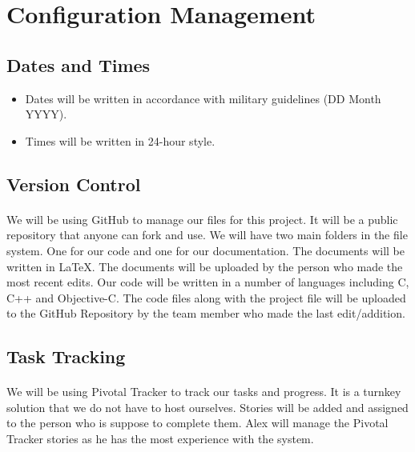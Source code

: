 \section{Configuration Management}
\subsection{Dates and Times}
\begin{itemize}
\item Dates will be written in accordance with military guidelines (DD Month YYYY).
\item Times will be written in 24-hour style.
\end{itemize}
\subsection{Version Control}
\paragraph{} We will be using GitHub to manage our files for this project. It will be a public repository that anyone can fork and use. We will have two main folders in the file system. One for our code and one for our documentation. The documents will be written in \LaTeX. The documents will be uploaded by the person who made the most recent edits. Our code will be written in a number of languages including C, C++ and Objective-C. The code files along with the project file will be uploaded to the GitHub Repository by the team member who made the last edit/addition.
\subsection{Task Tracking}
\paragraph{} We will be using Pivotal Tracker to track our tasks and progress. It is a turnkey solution that we do not have to host ourselves. Stories will be added and assigned to the person who is suppose to complete them. Alex will manage the Pivotal Tracker stories as he has the most experience with the system.